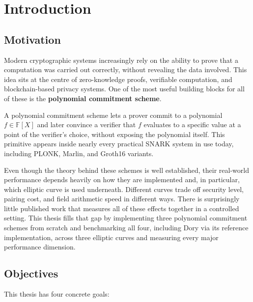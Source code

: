 \newcommand{\etas}{\ensuremath{\eta_{\mathrm{s}}}}

\chapter{Introduction}

\section{Motivation}
 
Modern cryptographic systems increasingly rely on the ability to prove
that a computation was carried out correctly, without revealing the
data involved. This idea sits at the centre of zero-knowledge proofs,
verifiable computation, and blockchain-based privacy systems. One of
the most useful building blocks for all of these is the
\textbf{polynomial commitment scheme}.
 
A polynomial commitment scheme lets a prover commit to a polynomial
$f \in \mathbb{F}[X]$ and later convince a verifier that $f$ evaluates
to a specific value at a point of the verifier's choice, without
exposing the polynomial itself. This primitive appears inside nearly
every practical SNARK system in use today, including PLONK, Marlin,
and Groth16 variants.
 
Even though the theory behind these schemes is well established, their
real-world performance depends heavily on how they are implemented and,
in particular, which elliptic curve is used underneath. Different
curves trade off security level, pairing cost, and field arithmetic
speed in different ways. There is surprisingly little published work
that measures all of these effects together in a controlled setting.
This thesis fills that gap by implementing three polynomial commitment
schemes from scratch and benchmarking all four, including Dory via its
reference implementation, across three elliptic curves and measuring
every major performance dimension.
 
\section{Objectives}
 
This thesis has four concrete goals:
 
